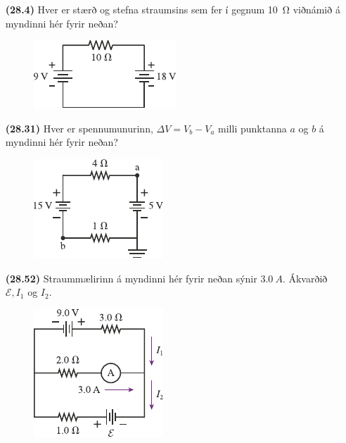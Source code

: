 \ifdefined \wholebook \else\documentclass[oneside]{book}\usepackage{EdlBook}\graphicspath{{figures/}}
\begin{document}
\begin{enumerate}[label = \textbf{(\alph*)}]

\item[\textbf{(28.4)}] Hver er stærð og stefna straumsins sem fer í gegnum \SI{10}{\ohm} viðnámið á myndinni hér fyrir neðan?

\begin{figure}[H]
    \centering
    \includegraphics[scale = 1.2]{figures/rk284.pdf}
\end{figure}

\item[\textbf{(28.31)}] Hver er spennumunurinn, $\Delta V  = V_b - V_a$ milli punktanna $a$ og $b$ á myndinni hér fyrir neðan?

\begin{figure}[H]
    \centering
    \includegraphics[scale = 1.2]{figures/rk2831.pdf}
\end{figure}

\item[\textbf{(28.52)}] Straummælirinn á myndinni hér fyrir neðan sýnir $\SI{3.0}{A}$. Ákvarðið $\mathcal{E}, I_1$ og $I_2$. 

\begin{figure}[H]
    \centering
    \includegraphics[scale = 1.2]{figures/rk2852.pdf}
\end{figure}


\end{enumerate}
\end{document}
